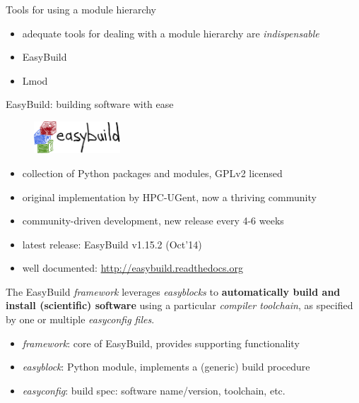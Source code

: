 \documentclass[10pt,xcolor={usenames,dvipsnames}]{beamer}
\begin{document}

\begin{frame}{Tools for using a module hierarchy}
    \begin{itemize}
        \item adequate tools for dealing with a module hierarchy are \emph{indispensable}
        \item EasyBuild
        \item Lmod
    \end{itemize}
\end{frame}


\begin{frame}{EasyBuild: building software with ease}
    \begin{figure}[centering]
        \includegraphics[height=1.2cm]{easybuild_logo.jpg}
    \end{figure}
    \begin{itemize}
        \item collection of Python packages and modules, GPLv2 licensed
        \item original implementation by HPC-UGent, now a thriving community
        \item community-driven development, new release every 4-6 weeks
        \item latest release: EasyBuild v1.15.2 (Oct'14)
        \item well documented: \url{http://easybuild.readthedocs.org}
    \end{itemize}

    The EasyBuild \emph{framework} leverages \emph{easyblocks} to \textbf{automatically
    build and install (scientific) software} using a particular \emph{compiler toolchain},
    as specified by one or multiple \emph{easyconfig files}.

    \begin{itemize}
        \item \emph{framework}: core of EasyBuild, provides supporting functionality
        \item \emph{easyblock}: Python module, implements a (generic) build procedure
        \item \emph{easyconfig}: build spec: software name/version, toolchain, etc.
    \end{itemize}
\end{frame}
\end{document}
